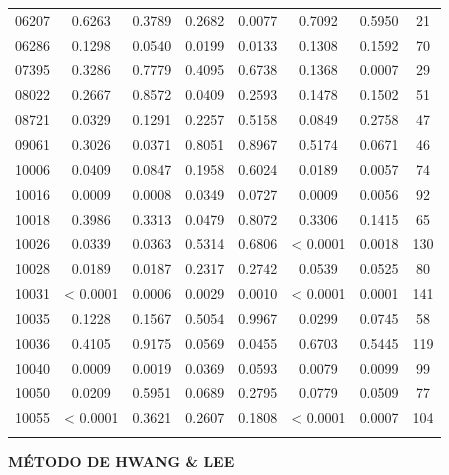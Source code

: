 \begin{table}[H]
{\begin{tabular}{cccccccc}
06207 & 0.6263 & 0.3789 & 0.2682 & {\color{red}0.0077} & 0.7092 & 0.5950 & 21 \\
06286 & 0.1298 & 0.0540 & {\color{red}0.0199} & {\color{red}0.0133} & 0.1308 & 0.1592 & 70 \\
07395 & 0.3286 & 0.7779 & 0.4095 & 0.6738 & 0.1368 & {\color{red}0.0007} & 29 \\
08022 & 0.2667 & 0.8572 & {\color{red}0.0409} & 0.2593 & 0.1478 & 0.1502 & 51 \\
08721 & {\color{red}0.0329} & 0.1291 & 0.2257 & 0.5158 & 0.0849 & 0.2758 & 47 \\
09061 & 0.3026 & {\color{red}0.0371} & 0.8051 & 0.8967 & 0.5174 & 0.0671 & 46 \\
10006 & {\color{red}0.0409} & 0.0847 & 0.1958 & 0.6024 & {\color{red}0.0189} & {\color{red}0.0057} & 74 \\
10016 & {\color{red}0.0009} & {\color{red}0.0008} & {\color{red}0.0349} & 0.0727 & {\color{red}0.0009} & {\color{red}0.0056} & 92 \\
10018 & 0.3986 & 0.3313 & {\color{red}0.0479} & 0.8072 & 0.3306 & 0.1415 & 65 \\
10026 & {\color{red}0.0339} & {\color{red}0.0363} & 0.5314 & 0.6806 & {\color{red} < 0.0001} & {\color{red}0.0018} & 130 \\
10028 & {\color{red}0.0189} & {\color{red}0.0187} & 0.2317 & 0.2742 & 0.0539 & 0.0525 & 80 \\
10031 & {\color{red} < 0.0001} & {\color{red}0.0006} & {\color{red}0.0029} & {\color{red}0.0010} & {\color{red} < 0.0001} & {\color{red}0.0001} & 141 \\
10035 & 0.1228 & 0.1567 & 0.5054 & 0.9967 & {\color{red}0.0299} & 0.0745 & 58 \\
10036 & 0.4105 & 0.9175 & 0.0569 & {\color{red}0.0455} & 0.6703 & 0.5445 & 119 \\
10040 & {\color{red}0.0009} & {\color{red}0.0019} & {\color{red}0.0369} & 0.0593 & {\color{red}0.0079} & {\color{red}0.0099} & 99 \\
10050 & {\color{red}0.0209} & 0.5951 & 0.0689 & 0.2795 & 0.0779 & 0.0509 & 77 \\
10055 & {\color{red} < 0.0001} & 0.3621 & 0.2607 & 0.1808 & {\color{red} < 0.0001} & {\color{red}0.0007} & 104 \\ \hline

\label{tab:nosocsII}
\end{tabular}
}
\end{table}

\textbf{MÉTODO DE HWANG \& LEE}

